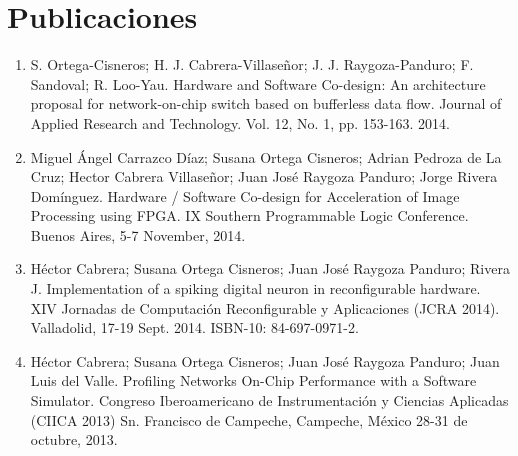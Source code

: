 \section{Publicaciones}
	\label{publicaciones}

	\begin{enumerate}

		\item S. Ortega-Cisneros; H. J. Cabrera-Villaseñor; J. J. Raygoza-Panduro; F. Sandoval; R. Loo-Yau. Hardware and Software Co-design: An architecture proposal for network-on-chip switch based on bufferless data flow. Journal of Applied Research and Technology. Vol. 12, No. 1, pp. 153-163. 2014.

		\item Miguel Ángel Carrazco Díaz; Susana Ortega Cisneros; Adrian Pedroza de La Cruz; Hector Cabrera Villaseñor; Juan José Raygoza Panduro; Jorge Rivera Domínguez. Hardware / Software Co-design for Acceleration of Image Processing using FPGA. IX Southern Programmable Logic Conference. Buenos Aires, 5-7 November, 2014.

		\item Héctor Cabrera; Susana Ortega Cisneros; Juan José Raygoza Panduro; Rivera J. Implementation of a spiking digital neuron in reconfigurable hardware. XIV Jornadas de Computación Reconfigurable y Aplicaciones (JCRA 2014). Valladolid, 17-19 Sept. 2014. ISBN-10: 84-697-0971-2.

		\item Héctor Cabrera; Susana Ortega Cisneros; Juan José Raygoza Panduro; Juan Luis del Valle. Profiling Networks On-Chip Performance with a Software Simulator. Congreso Iberoamericano de Instrumentación y Ciencias Aplicadas (CIICA 2013) Sn. Francisco de Campeche, Campeche, México 28-31 de octubre, 2013.

	\end{enumerate}